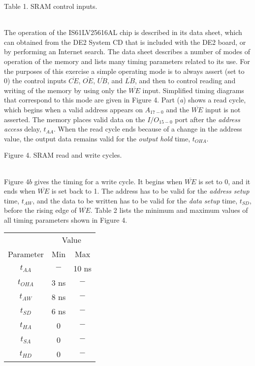 \documentclass[psfig,10pt,fullpage]{article}
\begin{document}
\begin{center}
Table 1. SRAM control inputs.
\end{center}

~\\
\noindent
The operation of the IS61LV25616AL chip is described in its data sheet, which can obtained
from the DE2 System CD that is included with the DE2 board,
or by performing an Internet search. The data sheet describes a
number of modes of operation of the memory and lists many timing parameters related to
its use. For the purposes of this exercise a simple operating mode is to always assert
(set to 0) the control inputs 
$\overline{CE}$, $\overline{OE}$, $\overline{UB}$, and $\overline{LB}$,
and then to control reading and writing of the memory by using only the $\overline{WE}$
input. Simplified timing diagrams that correspond to this mode are given in Figure 4. 
Part ({\it a}) shows a read cycle, which begins when a valid address appears on 
$A_{17-0}$ and the $\overline{WE}$ input is not asserted. The memory places valid 
data on the $I/O_{15-0}$ port after the {\it address access} delay, $t_{AA}$. When 
the read cycle ends because of a change in
the address value, the output data remains valid for the {\it output hold} time, $t_{OHA}$.

\begin{figure}[H]
\scriptsize
\centerline{
\hbox{}}
\end{figure}
\centerline{Figure 4.  SRAM read and write cycles.}

~\\
Figure 4$b$ gives the timing for a write cycle. It begins when $\overline{WE}$ is set
to 0, and it ends when $\overline{WE}$ is set back to 1. The address has to be valid for
the {\it address setup} time, $t_{AW}$, and the data to be written has to be
valid for the {\it data setup} time, $t_{SD}$, before the rising edge of $\overline{WE}$.
Table 2 lists the minimum and maximum values of all timing parameters shown in Figure 4.

\begin{center}
\begin{tabular}{c|c c}
~ & \multicolumn{2}{c}{Value} \\
Parameter & Min & Max\\ \hline
\rule[-0.075in]{0in}{0.25in} $t_{AA}$ & $-$ & 10 ns\\ 
\rule[-0.075in]{0in}{0.25in} $t_{OHA}$ & 3 ns & $-$\\ 
\rule[-0.075in]{0in}{0.25in} $t_{AW}$ & 8 ns & $-$\\ 
\rule[-0.075in]{0in}{0.25in} $t_{SD}$ & 6 ns & $-$\\ 
\rule[-0.075in]{0in}{0.25in} $t_{HA}$ & 0 & $-$\\ 
\rule[-0.075in]{0in}{0.25in} $t_{SA}$ & 0 & $-$\\ 
\rule[-0.075in]{0in}{0.25in} $t_{HD}$ & 0 & $-$\\ 
\end{tabular}
\end{center}
\end{document}
